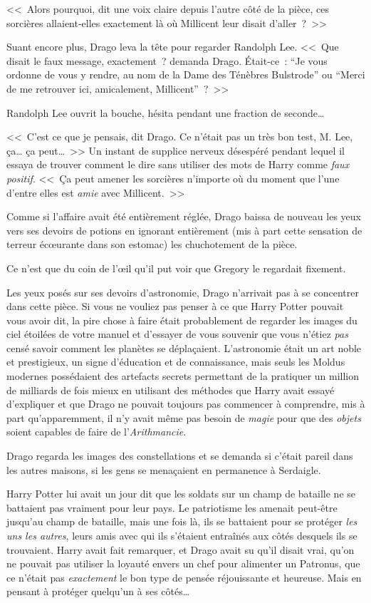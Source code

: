<<~Alors pourquoi, dit une voix claire depuis l'autre côté de la pièce, ces sorcières allaient-elles exactement là où Millicent leur disait d'aller~?~>>

Suant encore plus, Drago leva la tête pour regarder Randolph Lee. <<~Que disait le faux message, exactement~? demanda Drago. Était-ce~: “Je vous ordonne de vous y rendre, au nom de la Dame des Ténèbres Bulstrode” ou “Merci de me retrouver ici, amicalement, Millicent”~?~>>

Randolph Lee ouvrit la bouche, hésita pendant une fraction de seconde…

<<~C'est ce que je pensais, dit Drago. Ce n'était pas un très bon test, M. Lee, ça… ça peut…~>> Un instant de supplice nerveux désespéré pendant lequel il essaya de trouver comment le dire sans utiliser des mots de Harry comme \emph{faux positif}. <<~Ça peut amener les sorcières n'importe où du moment que l'une d'entre elles est \emph{amie} avec Millicent.~>>

Comme si l'affaire avait été entièrement réglée, Drago baissa de nouveau les yeux vers ses devoirs de potions en ignorant entièrement (mis à part cette sensation de terreur écœurante dans son estomac) les chuchotement de la pièce.

Ce n'est que du coin de l'œil qu'il put voir que Gregory le regardait fixement.

\later

Les yeux posés sur ses devoirs d'astronomie, Drago n'arrivait pas à se concentrer dans cette pièce. Si vous ne vouliez pas penser à ce que Harry Potter pouvait vous avoir dit, la pire chose à faire était probablement de regarder les images du ciel étoilées de votre manuel et d'essayer de vous souvenir que vous n'étiez \emph{pas} censé savoir comment les planètes se déplaçaient. L'astronomie était un art noble et prestigieux, un signe d'éducation et de connaissance, mais seuls les Moldus modernes possédaient des artefacts secrets permettant de la pratiquer un million de milliards de fois mieux en utilisant des méthodes que Harry avait essayé d'expliquer et que Drago ne pouvait toujours pas commencer à comprendre, mis à part qu'apparemment, il n'y avait même pas besoin de \emph{magie} pour que des \emph{objets} soient capables de faire de l'\emph{Arithmancie}.

Drago regarda les images des constellations et se demanda si c'était pareil dans les autres maisons, si les gens se menaçaient en permanence à Serdaigle.

Harry Potter lui avait un jour dit que les soldats sur un champ de bataille ne se battaient pas vraiment pour leur pays. Le patriotisme les amenait peut-être jusqu'au champ de bataille, mais une fois là, ils se battaient pour se protéger \emph{les uns les autres}, leurs amis avec qui ils s'étaient entraînés aux côtés desquels ils se trouvaient. Harry avait fait remarquer, et Drago avait su qu'il disait vrai, qu'on ne pouvait pas utiliser la loyauté envers un chef pour alimenter un Patronus, que ce n'était pas \emph{exactement} le bon type de pensée réjouissante et heureuse. Mais en pensant à protéger quelqu'un à ses côtés…

